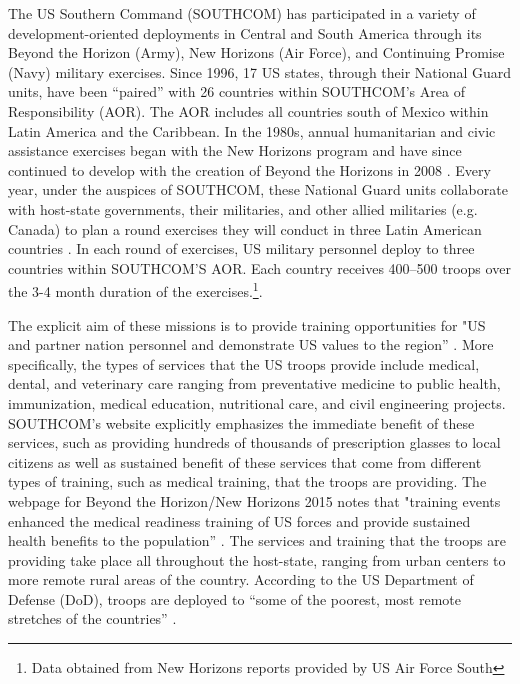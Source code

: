 \documentclass[12pt]{article}
\begin{document}
\begin{doublespace}
The US Southern Command (SOUTHCOM) has participated in a variety of development-oriented deployments in Central and South America through its Beyond the Horizon (Army), New Horizons (Air Force), and Continuing Promise (Navy) military exercises. Since 1996, 17 US states, through their National Guard units, have been ``paired'' with 26 countries within SOUTHCOM's Area of Responsibility (AOR). The AOR includes all countries south of Mexico within Latin America and the Caribbean. In the 1980s, annual humanitarian and civic assistance exercises began with the New Horizons program and have since continued to develop with the creation of Beyond the Horizons in 2008 \cite{southcom2015}.
Every year, under the auspices of SOUTHCOM, these National Guard units collaborate with host-state governments, their militaries, and other allied militaries (e.g. Canada) to plan a round exercises they will conduct in three Latin American countries \cite{SouthcomStatePartner}.
In each round of exercises, US military personnel deploy to three countries within SOUTHCOM'S AOR. Each country receives 400--500 troops over the 3-4 month duration of the exercises.\footnote{Data obtained from New Horizons reports provided by US Air Force South}.

The explicit aim of these missions is to provide training opportunities for "US and partner nation personnel and demonstrate US values to the region'' \cite{SouthcomStatePartner}. More specifically, the types of services that the US troops provide include medical, dental, and veterinary care ranging from preventative medicine to public health, immunization, medical education, nutritional care, and civil engineering projects. SOUTHCOM's website explicitly emphasizes the immediate benefit of these services, such as providing hundreds of thousands of prescription glasses to local citizens as well as sustained benefit of these services that come from different types of training, such as medical training, that the troops are providing. The webpage for Beyond the Horizon/New Horizons 2015 notes that "training events enhanced the medical readiness training of US forces and provide sustained health benefits to the population'' \cite{southcom2015}. The services and training that the troops are providing take place all throughout the host-state, ranging from urban centers to more remote rural areas of the country. According to the US Department of Defense (DoD), troops are deployed to ``some of the poorest, most remote stretches of the countries'' \cite{Miles2013}.


\end{doublespace}
\end{document}
